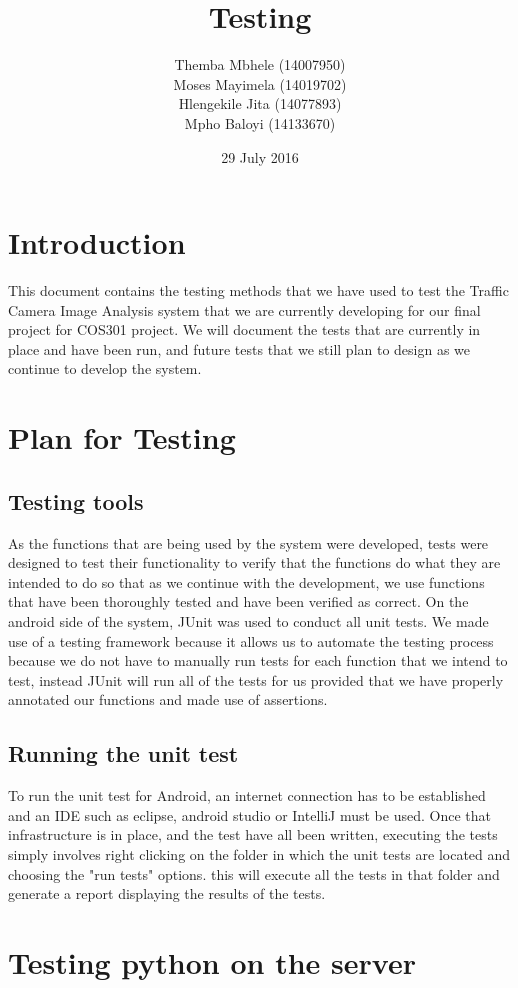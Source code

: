 \documentclass{article}
\title{Testing}
\author{Themba Mbhele (14007950)\\
        Moses Mayimela (14019702)\\
        Hlengekile Jita (14077893)\\
        Mpho Baloyi (14133670)\\
        }
\date{29 July 2016}
\begin{document}
\maketitle

\section{Introduction}
This document contains the testing methods that we have used to test the Traffic Camera Image Analysis system that we are currently developing for our final project for COS301 project. We will document the tests that are currently in place and have been run, and future tests that we still plan to design as we continue to develop the system.

\section{Plan for Testing}
\subsection{Testing tools}
As the functions that are being used by the system were developed, tests were designed to test their functionality to verify that the functions do what they are intended to do so that as we continue with the development, we use functions that have been thoroughly tested and have been verified as correct.
On the android side of the system, JUnit was used to conduct all unit tests. We
made use of a testing framework because it allows us to automate the testing process because we do not have to manually run tests for each function that we intend to test, instead JUnit will run all of the tests for us provided that we
have properly annotated our functions and made use of assertions.
\subsection{Running the unit test}
To run the unit test for Android, an internet connection has to be established and an IDE such as eclipse, android studio or IntelliJ must be used. Once that infrastructure is in place, and the test have all been written, executing the tests simply involves right clicking on the folder in which the unit tests are located and choosing the "run tests" options. this will execute all the tests in that folder and generate a report displaying the results of the tests.
\section{Testing python on the server}
\end{document}
